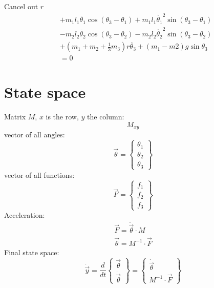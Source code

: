 \documentclass[titlepage]{article}
\numberwithin{equation}{section}
\begin{document}
Cancel out $r$
\begin{align}
 &+ m_1 l_1 \ddot{\theta_1} \cos{(\theta_3 - \theta_1)} + m_1 l_1 \dot{\theta_1}^2 \sin{(\theta_3 - \theta_1)} \nonumber \\
 &- m_2 l_2 \ddot{\theta_2} \cos{(\theta_3 - \theta_2)} - m_2 l_2 \dot{\theta_2}^2 \sin{(\theta_3 - \theta_2)} \nonumber \\
 &+ (m_1 + m_2 + \frac{1}{3} m_3) r \ddot{\theta_3} + (m_1 - m2) g \sin \theta_3 \nonumber \\
 &= 0
\end{align}

\pagebreak
\section{State space}
Matrix $M$, $x$ is the row, $y$ the column:
\begin{equation}
M_{xy}
\end{equation}
vector of all angles:
\begin{equation}
\overrightarrow{\theta} = \left\{\!
\begin{array}{c}
  \theta_1 \\
  \theta_2 \\
  \theta_3
\end{array}
\!\right\}
\end{equation}
vector of all functions:
\begin{equation}
\overrightarrow{F} = \left\{\!
\begin{array}{c}
  f_1 \\
  f_2 \\
  f_3
\end{array}
\!\right\}
\end{equation}
Acceleration:
\begin{align}
\overrightarrow{F} = \ddot{\overrightarrow{\theta}} \cdot M \\
\ddot{\overrightarrow{\theta}} = M^{-1} \cdot \overrightarrow{F}
\end{align}
Final state space:
\begin{equation}
\dot{\overrightarrow{y}} = \frac{d}{dt}
\left\{\!
\begin{array}{c}
  \overrightarrow{\theta} \\
  \dot{\overrightarrow{\theta}}
\end{array}
\!\right\} = 
\left\{\!
\begin{array}{c}
  \dot{\overrightarrow{\theta}} \\
  M^{-1} \cdot \overrightarrow{F}
\end{array}
\!\right\}
\end{equation}
\end{document}

